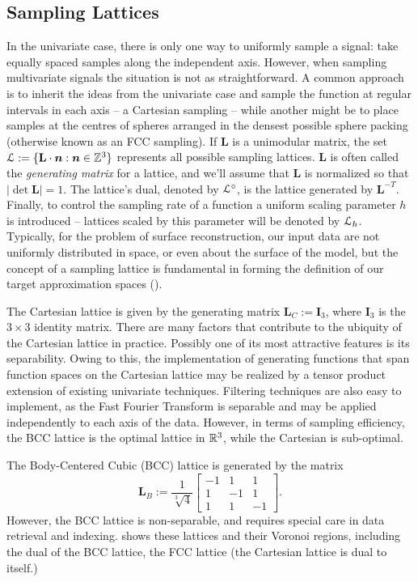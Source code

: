 \subsection{Sampling Lattices} \label{sec:smpl_review}
In the univariate case, there is only one way to uniformly sample a signal: take equally spaced samples along the independent axis. However, when sampling multivariate signals the situation is not as straightforward. A common approach is to inherit the ideas from the univariate case and sample the function at regular intervals in each axis -- a Cartesian sampling --  while another might be to place samples at the centres of spheres arranged in the densest possible sphere packing (otherwise known as an FCC sampling). If $\mathbf{L}$ is a unimodular matrix, the set $\mathcal{L} := \{\mathbf{L}\cdot\boldsymbol{n} : \boldsymbol{n} \in \mathbb{Z}^3 \}$ represents all possible sampling lattices. $\mathbf{L}$ is often called the \emph{generating matrix} for a lattice, and we'll assume that $\mathbf{L}$ is normalized so that $\left|\det\mathbf{L}\right| = 1$. The lattice's dual, denoted by $\mathcal{L}^{\circ}$, is the lattice generated by $\mathbf{L}^{-T}$. Finally, to control the sampling rate of a function a uniform scaling parameter $h$ is introduced -- lattices scaled by this parameter will be denoted by $\mathcal{L}_h$. Typically, for the problem of surface reconstruction, our input data are not uniformly distributed in space, or even about the surface of the model, but the concept of a sampling lattice is fundamental in forming the definition of our target approximation spaces ().

The Cartesian lattice is given by the generating matrix $\mathbf{L}_C:=\mathbf{I}_3$, where $\mathbf{I}_3$ is the $3 \times 3$ identity matrix. There are many factors that contribute to the ubiquity of the Cartesian lattice in practice. Possibly one of its most attractive features is its separability. Owing to this, the implementation of generating functions that span function spaces on the Cartesian lattice may be realized by a tensor product extension of existing univariate techniques. Filtering techniques are also easy to implement, as the Fast Fourier Transform is  separable and may be applied independently to each axis of the data. However, in terms of sampling efficiency, the BCC lattice is the optimal lattice in $\mathbb{R}^3$, while the Cartesian is sub-optimal.

The Body-Centered Cubic (BCC) lattice is generated by the matrix  {\footnotesize
\begin{equation*} 
	\mathbf{L}_B := \frac{1}{\sqrt[3]{4}}
	\begin{bmatrix}
		-1 & 1 & 1 \\ 
		1 & -1 & 1 \\ 
		1 & 1 & -1 
	\end{bmatrix}.
\end{equation*}}
However, the BCC lattice is non-separable, and requires special care in data retrieval and indexing.  shows these lattices and their Voronoi regions, including the dual of the BCC lattice, the FCC lattice (the Cartesian lattice is dual to itself.)

